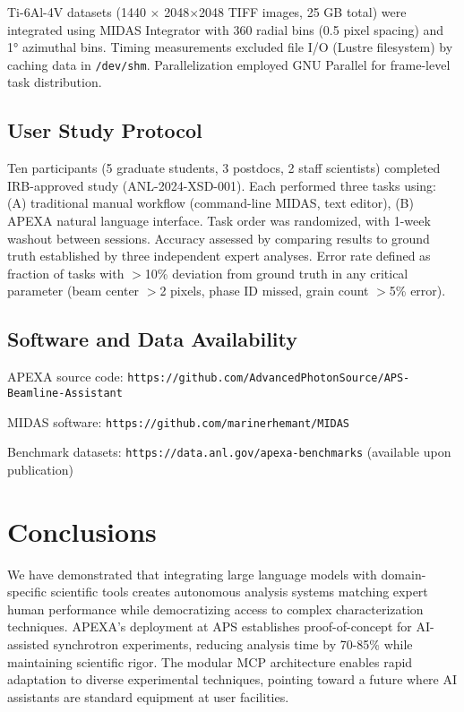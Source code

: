 \documentclass[11pt]{article}
\begin{document}
Ti-6Al-4V datasets (1440 $\times$ 2048$\times$2048 TIFF images, 25 GB total) were integrated using MIDAS Integrator with 360 radial bins (0.5 pixel spacing) and 1° azimuthal bins. Timing measurements excluded file I/O (Lustre filesystem) by caching data in \texttt{/dev/shm}. Parallelization employed GNU Parallel for frame-level task distribution.

\subsection{User Study Protocol}

Ten participants (5 graduate students, 3 postdocs, 2 staff scientists) completed IRB-approved study (ANL-2024-XSD-001). Each performed three tasks using: (A) traditional manual workflow (command-line MIDAS, text editor), (B) APEXA natural language interface. Task order was randomized, with 1-week washout between sessions. Accuracy assessed by comparing results to ground truth established by three independent expert analyses. Error rate defined as fraction of tasks with $>$10\% deviation from ground truth in any critical parameter (beam center $>$2 pixels, phase ID missed, grain count $>$5\% error).

\subsection{Software and Data Availability}

APEXA source code: \texttt{https://github.com/AdvancedPhotonSource/APS-Beamline-Assistant}

MIDAS software: \texttt{https://github.com/marinerhemant/MIDAS}

Benchmark datasets: \texttt{https://data.anl.gov/apexa-benchmarks} (available upon publication)

\section{Conclusions}

We have demonstrated that integrating large language models with domain-specific scientific tools creates autonomous analysis systems matching expert human performance while democratizing access to complex characterization techniques. APEXA's deployment at APS establishes proof-of-concept for AI-assisted synchrotron experiments, reducing analysis time by 70-85\% while maintaining scientific rigor. The modular MCP architecture enables rapid adaptation to diverse experimental techniques, pointing toward a future where AI assistants are standard equipment at user facilities.
\end{document}
